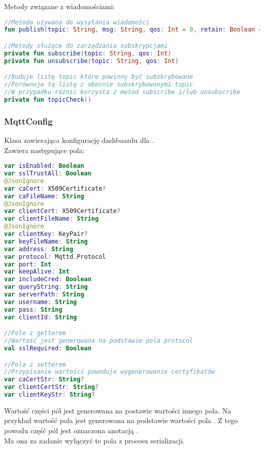 \newpage

Metody związane z wiadomościami:

\begin{lstlisting}[language=Kotlin]
//Metoda używana do wysyłania wiadomości
fun publish(topic: String, msg: String, qos: Int = 0, retain: Boolean = false)

//Metody służące do zarządzania subskrypcjami
private fun subscribe(topic: String, qos: Int)
private fun unsubscribe(topic: String, qos: Int)

//Buduje listę topic które powinny być subskrybowane
//Porównuje tą listę z obecnie subskrybowanymi topic
//W przypadku różnic korzysta z metod subscribe i/lub unsubscribe
private fun topicCheck()
\end{lstlisting}

\newpage

\subsubsection{MqttConfig}
Klasa zawierająca konfigurację dashboardu dla .\\
Zawiera następujące pola:

\begin{lstlisting}[language=Kotlin]
var isEnabled: Boolean
var sslTrustAll: Boolean
@JsonIgnore
var caCert: X509Certificate?
var caFileName: String
@JsonIgnore
var clientCert: X509Certificate?
var clientFileName: String
@JsonIgnore
var clientKey: KeyPair?
var keyFileName: String
var address: String
var protocol: Mqttd.Protocol
var port: Int
var keepAlive: Int
var includeCred: Boolean
var queryString: String
var serverPath: String
var username: String
var pass: String
var clientId: String

//Pole z getterem
//Wartość jest generowana na podstawie pola protocol
val sslRequired: Boolean

//Pola z setterem
//Przypisanie wartości powoduje wygenerowanie certyfikatów 
var caCertStr: String?
var clientCertStr: String?
var clientKeyStr: String?
\end{lstlisting}

Wartość części pól jest generowana na postawie wartości innego pola. Na przykład wartość pola  jest generowana na podstawie wartości pola . Z tego powodu część pól jest oznaczona anotacją .\\
Ma ona za zadanie wyłączyć te pola z procesu serializacji.

\newpage

